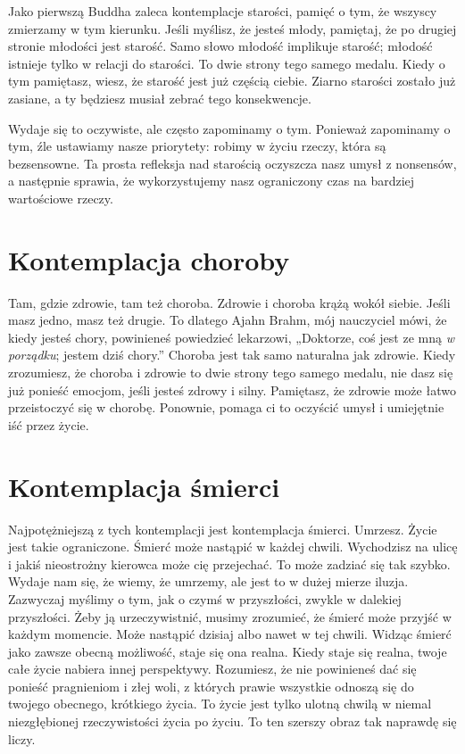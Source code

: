 \documentclass[12pt,openany]{book}
\begin{document}
Jako pierwszą Buddha zaleca kontemplacje starości, pamięć o tym, że wszyscy zmierzamy w tym kierunku. Jeśli myślisz, że jesteś młody, pamiętaj, że po drugiej stronie młodości jest starość. Samo słowo młodość implikuje starość; młodość istnieje tylko w relacji do starości. To dwie strony tego samego medalu. Kiedy o tym pamiętasz, wiesz, że starość jest już częścią ciebie. Ziarno starości zostało już zasiane, a ty będziesz musiał zebrać tego konsekwencje.

Wydaje się to oczywiste, ale często zapominamy o tym. Ponieważ zapominamy o tym, źle ustawiamy nasze priorytety: robimy w życiu rzeczy, która są bezsensowne. Ta prosta refleksja nad starością oczyszcza nasz umysł z nonsensów, a następnie sprawia, że wykorzystujemy nasz ograniczony czas na bardziej wartościowe rzeczy.

\section*{Kontemplacja choroby}

Tam, gdzie zdrowie, tam też choroba. Zdrowie i choroba krążą wokół siebie. Jeśli masz jedno, masz też drugie. To dlatego Ajahn Brahm, mój nauczyciel mówi, że kiedy jesteś chory, powinieneś powiedzieć lekarzowi, „Doktorze, coś jest ze mną \textit{w porządku}; jestem dziś chory.” Choroba jest tak samo naturalna jak zdrowie. Kiedy zrozumiesz, że choroba i zdrowie to dwie strony tego samego medalu, nie dasz się już ponieść emocjom, jeśli jesteś zdrowy i silny. Pamiętasz, że zdrowie może łatwo przeistoczyć się w chorobę. Ponownie, pomaga ci to oczyścić umysł i umiejętnie iść przez życie.

\section*{Kontemplacja śmierci}

Najpotężniejszą z tych kontemplacji jest kontemplacja śmierci. Umrzesz. Życie jest takie ograniczone. Śmierć może nastąpić w każdej chwili. Wychodzisz na ulicę i jakiś nieostrożny kierowca może cię przejechać. To może zadziać się tak szybko.
Wydaje nam się, że wiemy, że umrzemy, ale jest to w dużej mierze iluzja. Zazwyczaj myślimy o tym, jak o czymś w przyszłości, zwykle w dalekiej przyszłości. Żeby ją urzeczywistnić, musimy zrozumieć, że śmierć może przyjść w każdym momencie. Może nastąpić dzisiaj albo nawet w tej chwili. Widząc śmierć jako zawsze obecną możliwość, staje się ona realna. Kiedy staje się realna, twoje całe życie nabiera innej perspektywy. Rozumiesz, że nie powinieneś dać się ponieść pragnieniom i złej woli, z których prawie wszystkie odnoszą się do twojego obecnego, krótkiego życia. To życie jest tylko ulotną chwilą w niemal niezgłębionej rzeczywistości życia po życiu. To ten szerszy obraz tak naprawdę się liczy.
\end{document}

